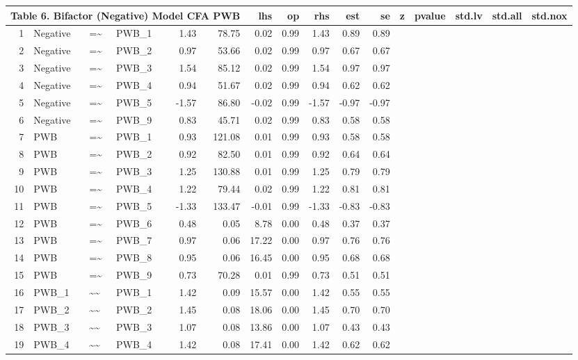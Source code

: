 \documentclass{article}
\begin{document}
\begin{table}[ht]
\centering
\begin{tabular}{rlllrrrrrrr}
 \multicolumn{ 6 }{l}{ Table 6. Bifactor (Negative) Model CFA PWB} \cr 
  \hline
 & lhs & op & rhs & est & se & z & pvalue & std.lv & std.all & std.nox \\ 
  \hline
1 & Negative & =\~{} & PWB\_1 & 1.43 & 78.75 & 0.02 & 0.99 & 1.43 & 0.89 & 0.89 \\ 
  2 & Negative & =\~{} & PWB\_2 & 0.97 & 53.66 & 0.02 & 0.99 & 0.97 & 0.67 & 0.67 \\ 
  3 & Negative & =\~{} & PWB\_3 & 1.54 & 85.12 & 0.02 & 0.99 & 1.54 & 0.97 & 0.97 \\ 
  4 & Negative & =\~{} & PWB\_4 & 0.94 & 51.67 & 0.02 & 0.99 & 0.94 & 0.62 & 0.62 \\ 
  5 & Negative & =\~{} & PWB\_5 & -1.57 & 86.80 & -0.02 & 0.99 & -1.57 & -0.97 & -0.97 \\ 
  6 & Negative & =\~{} & PWB\_9 & 0.83 & 45.71 & 0.02 & 0.99 & 0.83 & 0.58 & 0.58 \\ 
  7 & PWB & =\~{} & PWB\_1 & 0.93 & 121.08 & 0.01 & 0.99 & 0.93 & 0.58 & 0.58 \\ 
  8 & PWB & =\~{} & PWB\_2 & 0.92 & 82.50 & 0.01 & 0.99 & 0.92 & 0.64 & 0.64 \\ 
  9 & PWB & =\~{} & PWB\_3 & 1.25 & 130.88 & 0.01 & 0.99 & 1.25 & 0.79 & 0.79 \\ 
  10 & PWB & =\~{} & PWB\_4 & 1.22 & 79.44 & 0.02 & 0.99 & 1.22 & 0.81 & 0.81 \\ 
  11 & PWB & =\~{} & PWB\_5 & -1.33 & 133.47 & -0.01 & 0.99 & -1.33 & -0.83 & -0.83 \\ 
  12 & PWB & =\~{} & PWB\_6 & 0.48 & 0.05 & 8.78 & 0.00 & 0.48 & 0.37 & 0.37 \\ 
  13 & PWB & =\~{} & PWB\_7 & 0.97 & 0.06 & 17.22 & 0.00 & 0.97 & 0.76 & 0.76 \\ 
  14 & PWB & =\~{} & PWB\_8 & 0.95 & 0.06 & 16.45 & 0.00 & 0.95 & 0.68 & 0.68 \\ 
  15 & PWB & =\~{} & PWB\_9 & 0.73 & 70.28 & 0.01 & 0.99 & 0.73 & 0.51 & 0.51 \\ 
  16 & PWB\_1 & \~{}\~{} & PWB\_1 & 1.42 & 0.09 & 15.57 & 0.00 & 1.42 & 0.55 & 0.55 \\ 
  17 & PWB\_2 & \~{}\~{} & PWB\_2 & 1.45 & 0.08 & 18.06 & 0.00 & 1.45 & 0.70 & 0.70 \\ 
  18 & PWB\_3 & \~{}\~{} & PWB\_3 & 1.07 & 0.08 & 13.86 & 0.00 & 1.07 & 0.43 & 0.43 \\ 
  19 & PWB\_4 & \~{}\~{} & PWB\_4 & 1.42 & 0.08 & 17.41 & 0.00 & 1.42 & 0.62 & 0.62 \\ 

\end{tabular}
\end{table}
\end{document}
